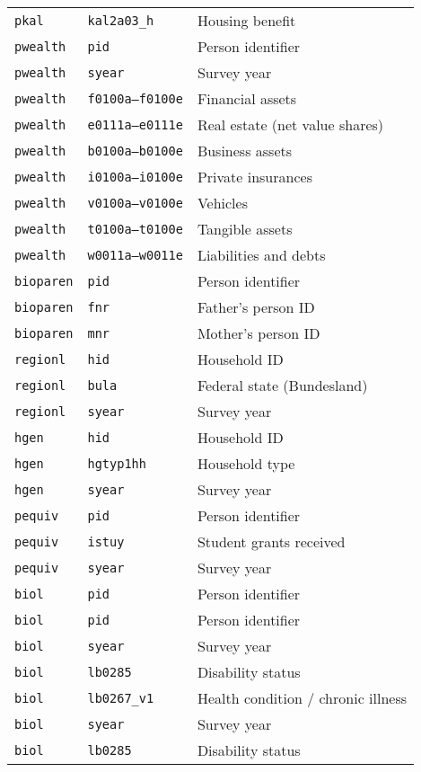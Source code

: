 \begin{longtable}{lll}
\texttt{pkal} & \texttt{kal2a03\_h} & Housing benefit \\
\texttt{pwealth} & \texttt{pid} & Person identifier \\
\texttt{pwealth} & \texttt{syear} & Survey year \\
\texttt{pwealth} & \texttt{f0100a--f0100e} & Financial assets \\
\texttt{pwealth} & \texttt{e0111a--e0111e} & Real estate (net value shares) \\
\texttt{pwealth} & \texttt{b0100a--b0100e} & Business assets \\
\texttt{pwealth} & \texttt{i0100a--i0100e} & Private insurances \\
\texttt{pwealth} & \texttt{v0100a--v0100e} & Vehicles \\
\texttt{pwealth} & \texttt{t0100a--t0100e} & Tangible assets \\
\texttt{pwealth} & \texttt{w0011a--w0011e} & Liabilities and debts \\
\texttt{bioparen} & \texttt{pid} & Person identifier \\
\texttt{bioparen} & \texttt{fnr} & Father’s person ID \\
\texttt{bioparen} & \texttt{mnr} & Mother’s person ID \\
\texttt{regionl} & \texttt{hid} & Household ID \\
\texttt{regionl} & \texttt{bula} & Federal state (Bundesland) \\
\texttt{regionl} & \texttt{syear} & Survey year \\
\texttt{hgen} & \texttt{hid} & Household ID \\
\texttt{hgen} & \texttt{hgtyp1hh} & Household type \\
\texttt{hgen} & \texttt{syear} & Survey year \\
\texttt{pequiv} & \texttt{pid} & Person identifier \\
\texttt{pequiv} & \texttt{istuy} & Student grants received \\
\texttt{pequiv} & \texttt{syear} & Survey year \\
\texttt{biol} & \texttt{pid} & Person identifier \\
\texttt{biol} & \texttt{pid} & Person identifier \\
\texttt{biol} & \texttt{syear} & Survey year \\
\texttt{biol} & \texttt{lb0285} & Disability status \\
\texttt{biol} & \texttt{lb0267\_v1} & Health condition / chronic illness \\
\texttt{biol} & \texttt{syear} & Survey year \\
\texttt{biol} & \texttt{lb0285} & Disability status \\
\end{longtable}
